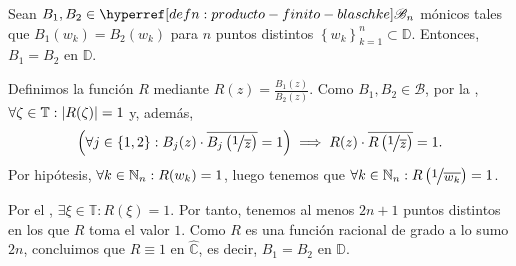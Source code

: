 \begin{teo}\label{teo:unicidad-prod-finitos-blaschke}
    Sean $B_1, B_2 \in \exhyperref[defn:producto-finito-blaschke]{producto-finito-blaschke}{\mathscr{B}_n}$ mónicos tales que $B_1(w_k) = B_2(w_k)$ para $n$ puntos distintos $\left\{w_k\right\}_{k=1}^n \subset \mathbb{D}$. Entonces, $B_1 = B_2$ en $\mathbb{D}$.
\end{teo}
\begin{dem}
    Definimos la función $R$ mediante $R(z) = \frac{B_1(z)}{B_2(z)}$. Como $B_1, B_2 \in \mathscr{B}$, por la , $\forall \zeta \in \mathbb{T} : \left|R(\zeta)\right| = 1$ y, además,
    \[
    \Big(\forall j \in \{1, 2\} : B_j(z)\cdot \bar{B_j \left(\sfrac{1}{\bar{z}}\right)} = 1\Big) \implies R(z) \cdot \bar{R \left(\sfrac{1}{\bar{z}}\right)} = 1.
    \]
    Por hipótesis, $\forall k \in \mathbb{N}_n : R(w_k) = 1$, luego tenemos que $\forall k \in \N_n : R\left(\sfrac{1}{\bar{w_k}}\right) = 1$.
    
    Por el , $\exists \xi \in \mathbb{T} : R(\xi) = 1$. Por tanto, tenemos al menos $2n + 1$ puntos distintos en los que $R$ toma el valor $1$. Como $R$ es una función racional de grado a lo sumo $2n$, concluimos que $R \equiv 1$ en $\widehat{\mathbb{C}}$, es decir, $B_1 = B_2$ en $\mathbb{D}$.\hfill\qedsymbol
\end{dem}

